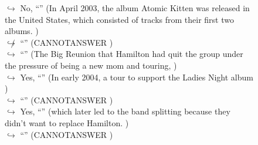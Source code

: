\documentclass[11pt,a4paper, onecolumn]{article}
\begin{document}
\begin{figure}[t] \small \begin{tcolorbox}[boxsep=0pt,left=5pt,right=0pt,top=2pt,colback = yellow!5] \begin{dialogue}
 \small 
\colorbox{pink!25}{$\hookrightarrow$}
\colorbox{red!25}{No,}
{ ``'' (In April 2003, the album Atomic Kitten was released in the United States, which consisted of tracks from their first two albums. ) }
\\
\colorbox{pink!25}{$\not\hookrightarrow$}
{ ``'' (CANNOTANSWER ) }
\\
\colorbox{pink!25}{$\hookrightarrow$}
{ ``'' (The Big Reunion that Hamilton had quit the group under the pressure of being a new mom and touring, ) }
\\
\colorbox{pink!25}{$\hookrightarrow$}
\colorbox{red!25}{Yes,}
{ ``'' (In early 2004, a tour to support the Ladies Night album ) }
\\
\colorbox{pink!25}{$\hookrightarrow$}
{ ``'' (CANNOTANSWER ) }
\\
\colorbox{pink!25}{$\hookrightarrow$}
\colorbox{red!25}{Yes,}
{ ``'' (which later led to the band splitting because they didn't want to replace Hamilton. ) }
\\
\colorbox{pink!25}{$\hookrightarrow$}
{ ``'' (CANNOTANSWER ) }
\\
 \end{dialogue}\end{tcolorbox}\end{figure}
\end{document}

